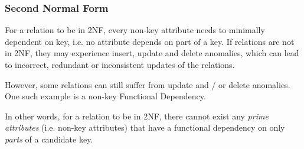 \subsubsection{Second Normal Form}
%

For a relation to be in 2NF, every non-key attribute needs to minimally dependent on  key, i.e. no attribute depends on part of a key.
If relations are not in 2NF, they may experience insert, update and delete anomalies,
which can lead to incorrect, redundant or inconsistent updates of the relations.

However, some relations can still suffer from update and / or delete anomalies. One such example is a non-key Functional Dependency.

\inlineintuition In other words, for a relation to be in 2NF, there cannot exist any \textit{prime attributes} (i.e. non-key attributes)
that have a functional dependency on only \textit{parts} of a candidate key.
